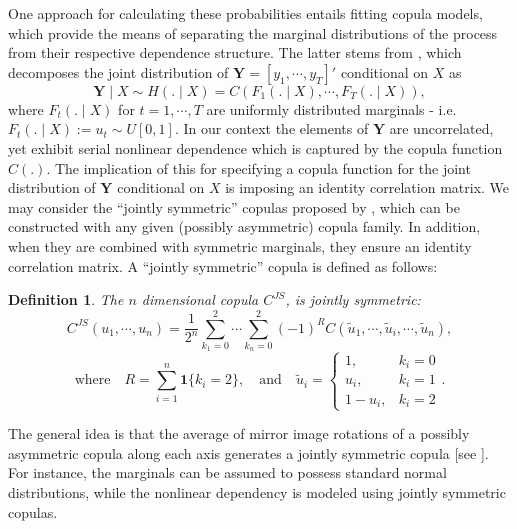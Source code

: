 \documentclass[harvard,11pt]{article}
\newtheorem{definition}{Definition}
\begin{document}
One approach for calculating these probabilities entails fitting copula models, which provide the means of separating the marginal distributions of the process from their respective dependence structure. The latter stems from \citet{sklar1959fonctions}, which decomposes the joint distribution of $\bm{Y}=[y_1,\cdots,y_T]'$ conditional on $X$ as
\[
\bm{Y}\mid X \sim H(.\mid X)=C\left(F_1(.\mid X),\cdots,F_T(.\mid X)\right),
\] 
where $F_t(.\mid X)$ for $t=1,\cdots,T$ are uniformly distributed marginals - i.e. $F_t(.\mid X):= u_t\sim U[0,1]$. In our context the elements of $\bm{Y}$ are uncorrelated, yet exhibit serial nonlinear dependence which is captured by the copula function $C(.)$. The implication of this for specifying a copula function for the joint distribution of $\bm{Y}$ conditional on $X$ is imposing an identity correlation matrix. We may consider the \textquotedblleft jointly symmetric\textquotedblright{ }copulas proposed by \citet{oh2016high}, which can be constructed with any given (possibly asymmetric) copula family. In addition, when they are combined with symmetric marginals, they ensure an identity correlation matrix. A \textquotedblleft jointly symmetric\textquotedblright{ }copula is defined as follows:
\begin{definition}
The $n$ dimensional copula $C^{JS}$, is jointly symmetric:
\[
C^{JS}\left(u_1,\cdots,u_n\right)=\frac{1}{2^n}\sum\limits_{k_1=0}^{2}\cdots\sum\limits_{k_n=0}^{2}\left(-1\right)^R C(\tilde{u}_1,\cdots,\tilde{u}_i,\cdots,\tilde{u}_n),
\] 
\[
\text{where}\quad R=\sum\limits_{i=1}^n\bm{1}\{k_i=2\},\quad\text{and}\quad\tilde{u}_i=
\begin{cases}
1,& k_i=0\\
u_i,&k_i=1\\
1-u_i,& k_i=2
\end{cases}.
\]
 \end{definition}
 The general idea is that the average of mirror image rotations of a possibly asymmetric copula along each axis generates a jointly symmetric copula [see \citet{oh2016high}]. For instance, the marginals can be assumed to possess standard normal distributions, while the nonlinear dependency is modeled using jointly symmetric copulas. %
\end{document}
